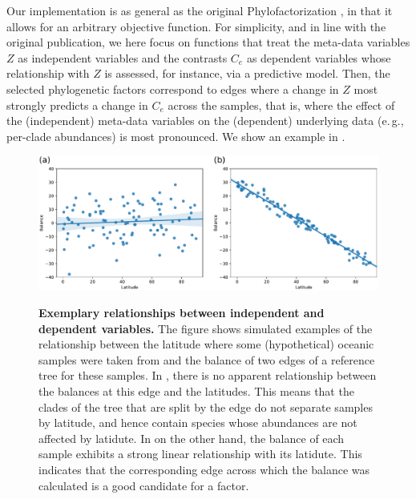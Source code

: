 Our implementation is as general as the original Phylofactorization \cite{Washburne2017a},
in that it allows for an arbitrary objective function.
For simplicity, and in line with the original publication,
we here focus on functions that treat the meta-data variables $Z$ as independent variables
and the contrasts $C_e$ as dependent variables whose relationship with $Z$ is assessed, for instance, via a predictive model.
Then, the selected phylogenetic factors correspond to edges
where a change in $Z$ most strongly predicts a change in $C_e$ across the samples,
that is, where the effect of the (independent) meta-data variables
on the (dependent) underlying data (e.\,g., per-clade abundances) is most pronounced.
We show an example in .

\begin{figure}[!htb]
    \centering
    \includegraphics[width=\linewidth]{pdf/balance_factors.pdf}
    \begin{subfigure}{0pt}
        \label{fig:balance_factors:sub:bad}
    \end{subfigure}
    \begin{subfigure}{0pt}
        \label{fig:balance_factors:sub:good}
    \end{subfigure}
    \caption[Exemplary relationships between independent and dependent variables]{
        \textbf{Exemplary relationships between independent and dependent variables.}
        The figure shows simulated examples of the relationship between the latitude
        where some (hypothetical) oceanic samples were taken from
        and the balance of two edges of a reference tree for these samples.
        In , there is no apparent relationship
        between the balances at this edge and the latitudes.
        This means that the clades of the tree that are split by the edge do not separate samples by latitude,
        and hence contain species whose abundances are not affected by latidute.
        In  on the other hand, the balance of each sample
        exhibits a strong linear relationship with its latidute.
        This indicates that the corresponding edge across which the balance was calculated
        is a good candidate for a factor.
    }
    \label{fig:balance_factors}
\end{figure}

